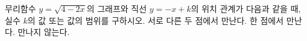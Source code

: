 무리함수 $y=\sqrt{4-2x}$의 그래프와 직선 $y=-x+k$의 위치 관계가 다음과 같을 때, 실수 $k$의 값 또는 값의 범위를 구하시오.
 서로 다른 두 점에서 만난다.
 한 점에서 만난다.
 만나지 않는다.
